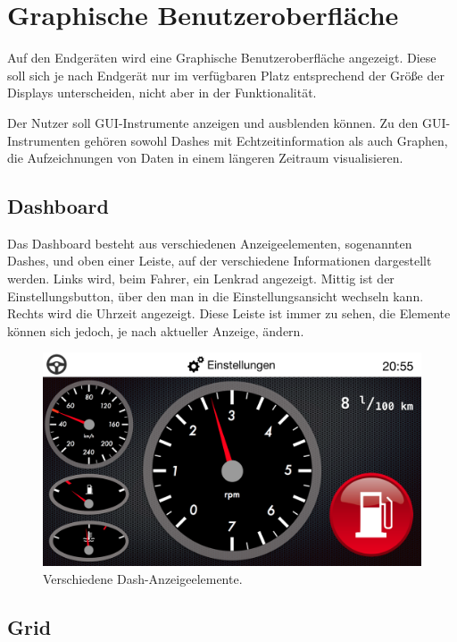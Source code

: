 \documentclass[pflichtenheft.tex]{subfiles}
\begin{document}
\chapter{Graphische Benutzeroberfläche}
Auf den Endgeräten wird eine Graphische Benutzeroberfläche angezeigt. Diese soll sich je nach Endgerät nur im verfügbaren Platz entsprechend der Größe der Displays unterscheiden, nicht aber in der Funktionalität.

Der Nutzer soll GUI-Instrumente anzeigen und ausblenden können. Zu den GUI-Instrumenten gehören sowohl Dashes mit Echtzeitinformation als auch Graphen, die Aufzeichnungen von Daten in einem längeren Zeitraum visualisieren.


\section{Dashboard}

Das Dashboard besteht aus verschiedenen Anzeigeelementen, sogenannten Dashes, und oben einer Leiste, auf der verschiedene Informationen dargestellt werden. Links wird, beim Fahrer, ein Lenkrad angezeigt. Mittig ist der Einstellungsbutton, über den man in die Einstellungsansicht wechseln kann. Rechts wird die Uhrzeit angezeigt. Diese Leiste ist immer zu sehen, die Elemente können sich jedoch, je nach aktueller Anzeige, ändern.

\begin{figure}[H]
  	\begin{center}
 		\includegraphics[width=\textwidth]{Images/GUI-Dashboard.png}
  		\caption{Verschiedene Dash-Anzeigeelemente.}
  	\end{center}
\end{figure}

\clearpage
\section{Grid}
\end{document}
